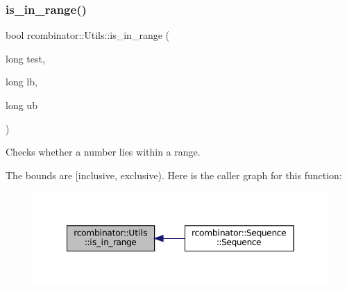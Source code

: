 \subsubsection{\texorpdfstring{is\+\_\+in\+\_\+range()}{is\_in\_range()}}
{\footnotesize\ttfamily bool rcombinator\+::\+Utils\+::is\+\_\+in\+\_\+range (\begin{DoxyParamCaption}\item[{long}]{test,  }\item[{long}]{lb,  }\item[{long}]{ub }\end{DoxyParamCaption})\hspace{0.3cm}{\ttfamily [inline]}}



Checks whether a number lies within a range. 

The bounds are \mbox{[}inclusive, exclusive). Here is the caller graph for this function\+:\nopagebreak
\begin{figure}[H]
\begin{center}
\leavevmode
\includegraphics[width=349pt]{namespacercombinator_1_1Utils_aa38fa31292dbf3a06522dc76b20e2572_icgraph}
\end{center}
\end{figure}
